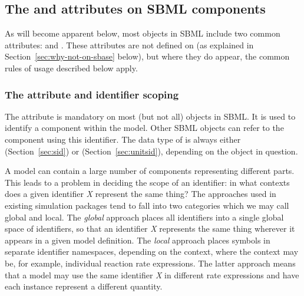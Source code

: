 \subsection{The  and  attributes on SBML components}
\label{sec:idnameattribs}

As will become apparent below, most objects in SBML include two
common attributes:  and .  These attributes are not
defined on \SBase (as explained in
Section~\ref{sec:why-not-on-sbase} below), but where they do
appear, the common rules of usage described below apply.


\subsubsection{The  attribute and identifier scoping}
\label{sec:identifiers}

The  attribute is mandatory on most (but not all)
objects in SBML.  It is used to identify a component within the
model.  Other SBML objects can refer to the component using this
identifier.  The data type of  is always either
 (Section~\ref{sec:sid}) or 
(Section~\ref{sec:unitsid}), depending on the object in question.

A model can contain a large number of components representing
different parts.  This leads to a problem in deciding the scope of
an identifier: in what contexts does a given identifier \emph{X}
represent the same thing?  The approaches used in existing
simulation packages tend to fall into two categories which we may
call global and local.  The \emph{global} approach places all
identifiers into a single global space of identifiers, so that an
identifier \emph{X} represents the same thing wherever it appears
in a given model definition.  The \emph{local} approach places
symbols in separate identifier namespaces, depending on the
context, where the context may be, for example, individual
reaction rate expressions.  The latter approach means that a model
may use the same identifier \emph{X} in different rate expressions
and have each instance represent a different quantity.

